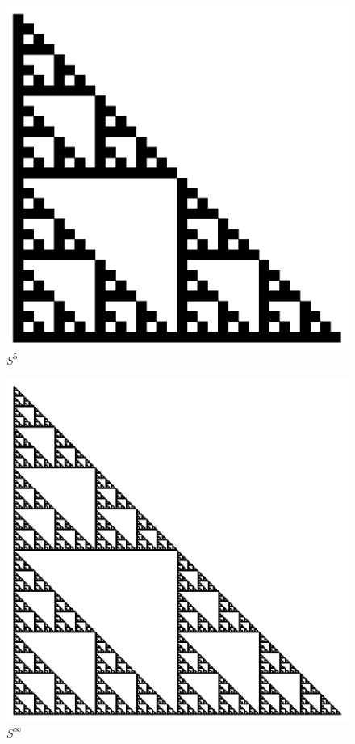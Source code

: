 \documentclass{beamer}
\begin{document}
\begin{frame}
    \begin{figure}
        \centering
        \includegraphics[scale=0.5]{5.pdf}
        \caption{$S^5$}
    \end{figure}
\end{frame}

\begin{frame}
    \begin{figure}
        \centering
        \includegraphics[scale=0.5]{GlobalMod2}
        \caption{$S^\infty$}
    \end{figure}
\end{frame}
\end{document}
